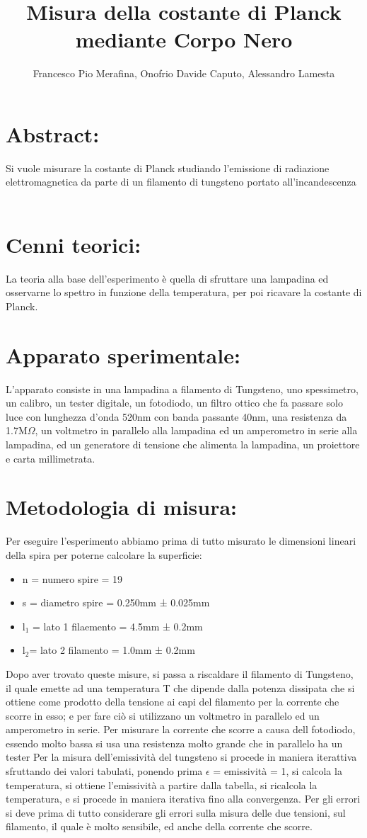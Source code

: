 \documentclass{article}
\title{Misura della costante di Planck mediante Corpo Nero}
\author{Francesco Pio Merafina, Onofrio Davide Caputo, Alessandro Lamesta}
\date{}
\begin{document}
\maketitle
\section{Abstract:}
Si vuole misurare la costante di Planck studiando l’emissione di radiazione elettromagnetica da parte di un filamento di tungsteno portato all’incandescenza
~
\section{Cenni teorici:}
La teoria alla base dell'esperimento è quella di sfruttare una lampadina ed osservarne lo spettro in funzione della temperatura, per poi ricavare la costante di Planck.
~
\section{Apparato sperimentale:}
L'apparato consiste in una lampadina a filamento di Tungsteno, uno spessimetro, un calibro, un tester digitale, un fotodiodo, un filtro ottico che fa passare solo luce con lunghezza d'onda 520nm con banda passante 40nm, una resistenza da 1.7M$\Omega$, un voltmetro in parallelo alla lampadina ed un amperometro in serie alla lampadina, ed un generatore di tensione che alimenta la lampadina, un proiettore e carta millimetrata.
~
\section{Metodologia di misura:}
Per eseguire l'esperimento abbiamo prima di tutto misurato le dimensioni lineari della spira per poterne calcolare la superficie:
\begin{itemize}
    \item n = numero spire = 19
    \item s = diametro spire = 0.250mm ± 0.025mm
    \item l$_{1}$ = lato 1 filaemento = 4.5mm ± 0.2mm
    \item l$_{2}$= lato 2 filamento = 1.0mm ± 0.2mm
\end{itemize}
Dopo aver trovato queste misure, si passa a riscaldare il filamento di Tungsteno, il quale emette ad una temperatura T che dipende dalla potenza dissipata che si ottiene come prodotto della tensione ai capi del filamento per la corrente che scorre in esso; e per fare ciò si utilizzano un voltmetro in parallelo ed un amperometro in serie. Per misurare la corrente che scorre a causa dell fotodiodo, essendo molto bassa si usa una resistenza molto grande che in parallelo ha un tester Per la misura dell'emissività del tungsteno si procede in maniera iterattiva sfruttando dei valori tabulati, ponendo prima $\epsilon$ = emissività = 1, si calcola la temperatura, si ottiene l'emissività a partire dalla tabella, si ricalcola la temperatura, e si procede in maniera iterativa fino alla convergenza. Per gli errori si deve prima di tutto considerare gli errori sulla misura delle due tensioni, sul filamento, il quale è molto sensibile, ed anche della corrente che scorre.
~
\end{document}
